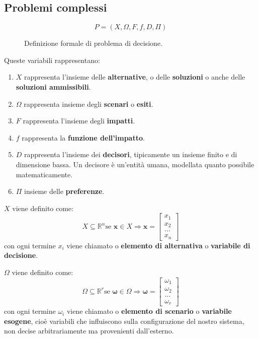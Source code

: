 \documentclass[\main/main.tex]{subfiles}
\begin{document}
\subsection{Problemi complessi}

\begin{figure}[H]
	\[
		P = (X, \Omega, F, f, D, \Pi)
	\]
	\caption{Definizione formale di problema di decisione.}
\end{figure}

Queste variabili rappresentano:

\begin{enumerate}
	\item $X$ rappresenta l'insieme delle \textbf{alternative}, o delle \textbf{soluzioni} o anche delle \textbf{soluzioni ammissibili}.
	\item $\Omega$ rappresenta insieme degli \textbf{scenari} o \textbf{esiti}.
	\item $F$ rappresenta l'insieme degli \textbf{impatti}.
	\item $f$ rappresenta la \textbf{funzione dell'impatto}.
	\item $D$ rappresenta l'insieme dei \textbf{decisori}, tipicamente un insieme finito e di dimensione bassa. Un decisore è un'entità umana, modellata quanto possibile matematicamente.
	\item $\Pi$ insieme delle \textbf{preferenze}.
\end{enumerate}

$X$ viene definito come: \[X \subseteq \mathbb{R}^n \text{se } \bm{x} \in X \Rightarrow \bm{x} = \begin{bmatrix}x_1\\x_2\\...\\x_n \end{bmatrix}\]
con ogni termine $x_i$ viene chiamato o \textbf{elemento di alternativa} o \textbf{variabile di decisione}.

$\Omega$ viene definito come: \[\Omega \subseteq \mathbb{R}^r \text{se } \bm{\omega} \in \Omega \Rightarrow \bm{\omega} = \begin{bmatrix}\omega_1\\\omega_2\\...\\\omega_r \end{bmatrix}\]
con ogni termine $\omega_i$ viene chiamato o \textbf{elemento di scenario} o \textbf{variabile esogene}, cioè variabili che influiscono sulla configurazione del nostro sistema, non decise arbitrariamente ma provenienti dall'esterno.
\end{document}
